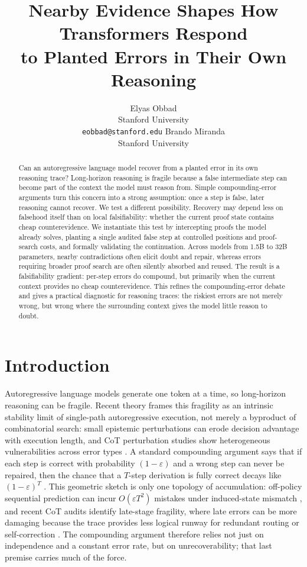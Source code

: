 \documentclass{article}
\title{Nearby Evidence Shapes How Transformers Respond\\
to Planted Errors in Their Own Reasoning}
\author{Elyas Obbad \\ Stanford University \\ \texttt{eobbad@stanford.edu}
\And Brando Miranda \\ Stanford University}
\date{}
\begin{document}
\ifcolmsubmission
\linenumbers
\fi

\maketitle

\begin{abstract}
Can an autoregressive language model recover from a planted error in its own
reasoning trace? Long-horizon reasoning is fragile because a false intermediate step
can become part of the context the model must reason from. Simple compounding-error
arguments turn this concern into a strong assumption: once a step is false, later
reasoning cannot recover. We test a different possibility. Recovery may depend less
on falsehood itself than on local falsifiability: whether the current proof state
contains cheap counterevidence. We instantiate this test by intercepting proofs the
model already solves, planting a single audited false step at controlled positions
and proof-search costs, and formally validating the continuation. Across models from
1.5B to 32B parameters, nearby contradictions often elicit doubt and repair, whereas
errors requiring broader proof search are often silently absorbed and reused. The
result is a falsifiability gradient: per-step errors do compound, but primarily when
the current context provides no cheap counterevidence. This refines the
compounding-error debate and gives a practical diagnostic for reasoning traces: the
riskiest errors are not merely wrong, but wrong where the surrounding context gives
the model little reason to doubt.
\end{abstract}


\section{Introduction}
Autoregressive language models generate one token at a time, so long-horizon reasoning
can be fragile. Recent theory frames this fragility as an intrinsic stability limit of
single-path autoregressive execution, not merely a byproduct of combinatorial search:
small epistemic perturbations can erode decision advantage with execution length, and
CoT perturbation studies show heterogeneous vulnerabilities across error types
\citep{liao2026stability,aravindan2026fragile}. A standard compounding argument says
that if each step is correct with probability $(1-\varepsilon)$ and a wrong step can
never be repaired, then the chance that a $T$-step derivation is fully correct decays
like $(1-\varepsilon)^T$ \citep{dziri2023faith}. This geometric sketch is only one
topology of accumulation: off-policy sequential prediction can incur
$O(\varepsilon T^2)$ mistakes under induced-state mismatch
\citep{ross2011reduction}, and recent CoT audits identify late-stage fragility, where
late errors can be more damaging because the trace provides less logical runway for
redundant routing or self-correction \citep{zhang2025ascot,neumann2025cascade}. The
compounding argument therefore relies not just on independence and a constant error
rate, but on unrecoverability; that last premise carries much of the force.
\end{document}
